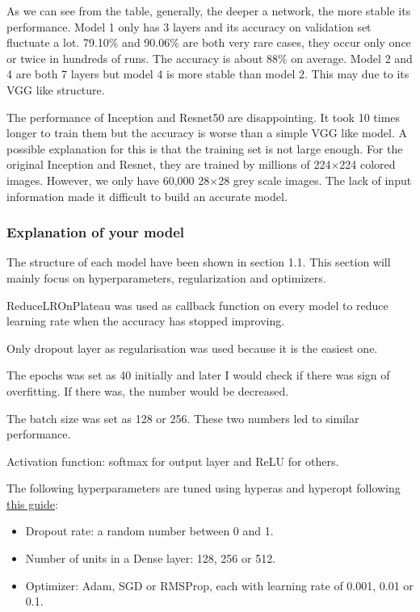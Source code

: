 \documentclass[12pt]{article}
\begin{document}
As we can see from the table, generally, the deeper a network, the more stable its performance. Model 1 only has 3 layers and its accuracy on validation set fluctuate a lot. 79.10\% and 90.06\% are both very rare cases, they occur only once or twice in hundreds of runs. The accuracy is about 88\% on average. Model 2 and 4 are both 7 layers but model 4 is more stable than model 2. This may due to its VGG like structure.

The performance of Inception and Resnet50 are disappointing. It took 10 times longer to train them but the accuracy is worse than a simple VGG like model. A possible explanation for this is that the training set is not large enough. For the original Inception and Resnet, they are trained by millions of 
224$\times$224 colored images. However, we only have 60,000 28$\times$28 grey scale images. The lack of input information made it difficult to build an accurate model.

\subsubsection{Explanation of your model}

The structure of each model have been shown in section 1.1. This section will mainly focus on hyperparameters, regularization and optimizers.

ReduceLROnPlateau was used as callback function on every model to reduce learning rate when the accuracy has stopped improving.

Only dropout layer as regularisation was used because it is the easiest one.

The epochs was set as 40 initially and later I would check if there was sign of overfitting. If there was, the number would be decreased.

The batch size was set as 128 or 256. These two numbers led to similar performance.

Activation function: softmax for output layer and ReLU for others.

The following hyperparameters are tuned using hyperas and hyperopt following \href{https://towardsdatascience.com/a-guide-to-an-efficient-way-to-build-neural-network-architectures-part-ii-hyper-parameter-42efca01e5d7}{this guide}:
\begin{itemize}
  \item Dropout rate: a random number between 0 and 1.
  \item Number of units in a Dense layer: 128, 256 or 512.
  \item Optimizer: Adam, SGD or RMSProp, each with learning rate of 0.001, 0.01 or 0.1.
\end{itemize}
\end{document}
